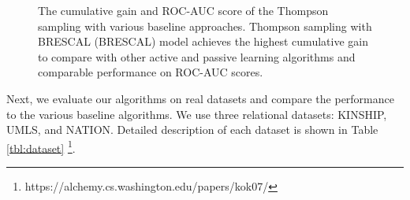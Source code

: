 \begin{figure}[t]
	\centering
	
	\caption{\label{fig:c_gain}The cumulative gain and ROC-AUC score of the Thompson sampling 
	with various baseline approaches. Thompson sampling with BRESCAL (BRESCAL) model achieves the highest cumulative gain to compare with other active and passive learning algorithms and comparable performance on ROC-AUC scores.}
\end{figure}

Next, we evaluate our algorithms on real datasets and compare the performance to the various baseline 
algorithms. We use three relational datasets: KINSHIP, UMLS, and NATION. Detailed description of each 
dataset is shown in Table \ref{tbl:dataset} \footnote{https://alchemy.cs.washington.edu/papers/kok07/}.

